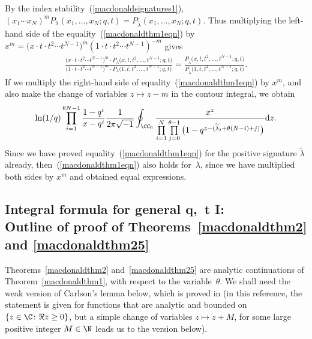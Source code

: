 By the index stability~(\ref{macdonaldsignatures1}), $(x_1\cdots x_N)^m P_{\lambda}(x_1, \dots, x_N; q, t) = P_{\widetilde{\lambda}}(x_1, \dots, x_N; q, t)$. Thus multiplying the left-hand side of the equality~(\ref{macdonaldthm1eqn}) by $x^m = \big(x\cdot t\cdot t^2\cdots t^{N-1}\big)^m(1\cdot t\cdot t^2\cdots t^{N-1})^{-m}$ gives
\begin{gather*}
\frac{\big(x\cdot t\cdot t^2\cdots t^{N-1}\big)^m \cdot P_{\lambda}\big(x, t, t^2, \dots, t^{N-1}; q, t\big)}{\big(1\cdot t\cdot t^2\cdots t^{N-1}\big)^m \cdot P_{\lambda}\big(1, t, t^2, \dots, t^{N-1}; q, t\big)} = \frac{P_{\widetilde{\lambda}}\big(x, t, t^2, \dots, t^{N-1}; q, t\big)}{P_{\widetilde{\lambda}}\big(1, t, t^2, \dots, t^{N-1}; q, t\big)}.
\end{gather*}
If we multiply the right-hand side of equality~(\ref{macdonaldthm1eqn}) by $x^m$, and also make the change of variables $z\mapsto z-m$ in the contour integral, we obtain
\begin{gather*}
\ln(1/q)\prod_{i=1}^{\theta N - 1}{\frac{1 - q^i}{x - q^i}}\frac{1}{2\pi\sqrt{-1}}\oint_{\CC_0}{\frac{x^z}{\prod\limits_{i=1}^N\prod\limits_{j=0}^{\theta -1}{\big(1 - q^{z - (\widetilde{\lambda}_i + \theta(N-i) + j)}\big)}}{\rm d}z}.
\end{gather*}
Since we have proved equality~(\ref{macdonaldthm1eqn}) for the positive signature $\widetilde{\lambda}$ already, then~(\ref{macdonaldthm1eqn}) also holds for~$\lambda$, since we have multiplied both sides by $x^m$ and obtained equal expressions.

\subsection[Integral formula for general $q$,~$t$ I: Outline of proof of Theorems~\ref{macdonaldthm2} and \ref{macdonaldthm25}]{Integral formula for general $\boldsymbol{q}$,~$\boldsymbol{t}$ I:\\ Outline of proof of Theorems~\ref{macdonaldthm2} and \ref{macdonaldthm25}}

Theorems~\ref{macdonaldthm2} and~\ref{macdonaldthm25} are analytic continuations of Theorem~\ref{macdonaldthm1}, with respect to the variable~$\theta$.
We shall need the weak version of Carlson's lemma below, which is proved in \cite[Theorem~2.8.1]{AAR} (in this reference, the statement is given for functions that are analytic and bounded on $\{z\in\C\colon \Re z \geq 0\}$, but a simple change of variables $z\mapsto z+M$, for some large positive integer $M\in\N$ leads us to the version below).

